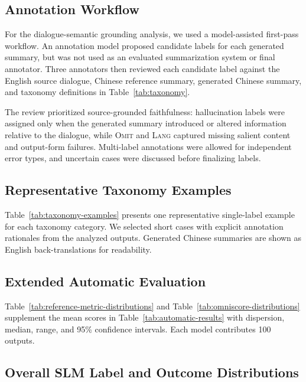 \documentclass[11pt]{article}
\begin{document}
\FloatBarrier

\subsection{Annotation Workflow}

\label{sec}



For the dialogue-semantic grounding analysis, we used a model-assisted first-pass workflow. An annotation model proposed candidate labels for each generated summary, but was not used as an evaluated summarization system or final annotator. Three annotators then reviewed each candidate label against the English source dialogue, Chinese reference summary, generated Chinese summary, and taxonomy definitions in Table~\ref{tab:taxonomy}.

The review prioritized source-grounded faithfulness: hallucination labels were assigned only when the generated summary introduced or altered information relative to the dialogue, while \textsc{Omit} and \textsc{Lang} captured missing salient content and output-form failures. Multi-label annotations were allowed for independent error types, and uncertain cases were discussed before finalizing labels.

\subsection{Representative Taxonomy Examples}
\label{sec:appendix-taxonomy-examples}

Table~\ref{tab:taxonomy-examples} presents one representative single-label example for each taxonomy category. We selected short cases with explicit annotation rationales from the analyzed outputs. Generated Chinese summaries are shown as English back-translations for readability.

\subsection{Extended Automatic Evaluation}
\label{sec:appendix-extended-eval}

Table~\ref{tab:reference-metric-distributions} and Table~\ref{tab:omniscore-distributions} supplement the mean scores in Table~\ref{tab:automatic-results} with dispersion, median, range, and 95\% confidence intervals. Each model contributes 100 outputs.

\subsection{Overall SLM Label and Outcome Distributions}
\label{sec:appendix-overall-taxonomy}
\end{document}
